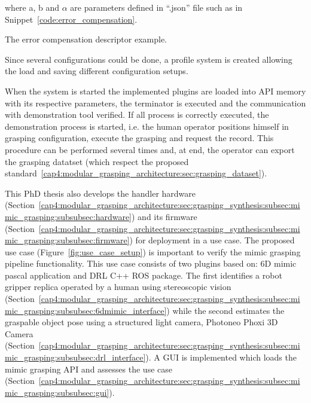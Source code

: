 where a, b and $\alpha$ are parameters defined in ``.json'' file such as in Snippet~\ref{code:error_compensation}.

\begin{snippet}[h!]
	\centering
	\caption{The error compensation descriptor example.}
	\label{code:error_compensation}
\end{snippet}

Since several configurations could be done, a profile system is created allowing the load and saving different configuration setups.

When the system is started the implemented plugins are loaded into API memory with its respective parameters, the terminator is executed and the communication with demonstration tool verified. If all process is correctly executed, the demonstration process is started, i.e. the human operator positions himself in grasping configuration, execute the grasping and request the record. This procedure can be performed several times and, at end, the operator can export the grasping datatset (which respect the proposed standard~\ref{cap4:modular_grasping_architecture:sec:grasping_dataset}).

This PhD thesis also develops the handler hardware (Section~\ref{cap4:modular_grasping_architecture:sec:grasping_synthesis:subsec:mimic_grasping:subsubsec:hardware}) and its firmware (Section~\ref{cap4:modular_grasping_architecture:sec:grasping_synthesis:subsec:mimic_grasping:subsubsec:firmware}) for deployment in a use case. The proposed use case (Figure~\ref{fig:use_case_setup}) is important to verify the mimic grasping pipeline functionality. This use case consists of two plugins based on: 6D mimic pascal application and \ac{DRL} C++ \ac{ROS} package. The first identifies a robot gripper replica operated by a human using stereoscopic vision (Section~\ref{cap4:modular_grasping_architecture:sec:grasping_synthesis:subsec:mimic_grasping:subsubsec:6dmimic_interface}) while the second estimates the graspable object pose using a structured light camera, Photoneo Phoxi 3D Camera~\cite{photoneo} (Section~\ref{cap4:modular_grasping_architecture:sec:grasping_synthesis:subsec:mimic_grasping:subsubsec:drl_interface}). A \ac{GUI} is implemented which loads the mimic grasping API and assesses the use case (Section~\ref{cap4:modular_grasping_architecture:sec:grasping_synthesis:subsec:mimic_grasping:subsubsec:gui}).

